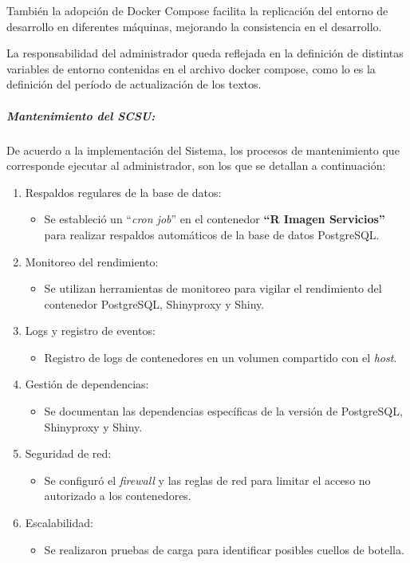 \documentclass[
  12pt,
  openany]{book}
\providecommand{\tightlist}{%
  \setlength{\itemsep}{0pt}\setlength{\parskip}{0pt}}
\begin{document}
También la adopción de Docker Compose facilita la replicación del entorno de desarrollo en diferentes máquinas, mejorando la consistencia en el desarrollo.

La responsabilidad del administrador queda reflejada en la definición de distintas variables de entorno contenidas en el archivo docker compose, como lo es la definición del período de actualización de los textos.

\hypertarget{mantenimiento-del-scsu}{%
\subparagraph{Mantenimiento del SCSU:}\label{mantenimiento-del-scsu}}

De acuerdo a la implementación del Sistema, los procesos de mantenimiento que corresponde ejecutar al administrador, son los que se detallan a continuación:

\begin{enumerate}
\def\labelenumi{\arabic{enumi}.}
\item
  Respaldos regulares de la base de datos:

  \begin{itemize}
  \tightlist
  \item
    Se estableció un ``\emph{cron job}'' en el contenedor \textbf{``R Imagen Servicios''} para realizar respaldos automáticos de la base de datos PostgreSQL.
  \end{itemize}
\item
  Monitoreo del rendimiento:

  \begin{itemize}
  \tightlist
  \item
    Se utilizan herramientas de monitoreo para vigilar el rendimiento del contenedor PostgreSQL, Shinyproxy y Shiny.
  \end{itemize}
\item
  Logs y registro de eventos:

  \begin{itemize}
  \tightlist
  \item
    Registro de logs de contenedores en un volumen compartido con el \emph{host}.
  \end{itemize}
\item
  Gestión de dependencias:

  \begin{itemize}
  \tightlist
  \item
    Se documentan las dependencias específicas de la versión de PostgreSQL, Shinyproxy y Shiny.
  \end{itemize}
\item
  Seguridad de red:

  \begin{itemize}
  \tightlist
  \item
    Se configuró el \emph{firewall} y las reglas de red para limitar el acceso no autorizado a los contenedores.
  \end{itemize}
\item
  Escalabilidad:

  \begin{itemize}
  \tightlist
  \item
    Se realizaron pruebas de carga para identificar posibles cuellos de botella.
  \end{itemize}
\end{enumerate}
\end{document}
